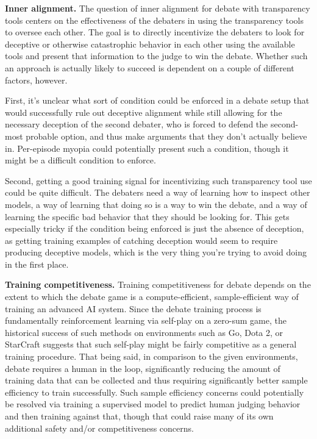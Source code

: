 \textbf{Inner alignment.} The question of inner alignment for debate with transparency tools centers on the effectiveness of the debaters in using the transparency tools to oversee each other. The goal is to directly incentivize the debaters to look for deceptive or otherwise catastrophic behavior in each other using the available tools and present that information to the judge to win the debate. Whether such an approach is actually likely to succeed is dependent on a couple of different factors, however.

First, it's unclear what sort of condition could be enforced in a debate setup that would successfully rule out deceptive alignment\cite{TODO: cite https://www.alignmentforum.org/posts/zthDPAjh9w6Ytbeks/deceptive-alignment} while still allowing for the necessary deception of the second debater, who is forced to defend the second-most probable option, and thus make arguments that they don't actually believe in. Per-episode myopia could potentially present such a condition, though it might be a difficult condition to enforce.

Second, getting a good training signal for incentivizing such transparency tool use could be quite difficult. The debaters need a way of learning how to inspect other models, a way of learning that doing so is a way to win the debate, and a way of learning the specific bad behavior that they should be looking for. This gets especially tricky if the condition being enforced is just the absence of deception, as getting training examples of catching deception would seem to require producing deceptive models, which is the very thing you're trying to avoid doing in the first place.

\textbf{Training competitiveness.} Training competitiveness for debate depends on the extent to which the debate game is a compute-efficient, sample-efficient way of training an advanced AI system. Since the debate training process is fundamentally reinforcement learning via self-play on a zero-sum game, the historical success of such methods on environments such as Go\cite{TODO: cite https://deepmind.com/blog/article/alphazero-shedding-new-light-grand-games-chess-shogi-and-go}, Dota 2\cite{TODO: cite https://openai.com/blog/openai-five/}, or StarCraft\cite{TODO: cite https://deepmind.com/blog/article/alphastar-mastering-real-time-strategy-game-starcraft-ii} suggests that such self-play might be fairly competitive as a general training procedure. That being said, in comparison to the given environments, debate requires a human in the loop, significantly reducing the amount of training data that can be collected and thus requiring significantly better sample efficiency to train successfully. Such sample efficiency concerns could potentially be resolved via training a supervised model to predict human judging behavior and then training against that, though that could raise many of its own additional safety and/or competitiveness concerns.

